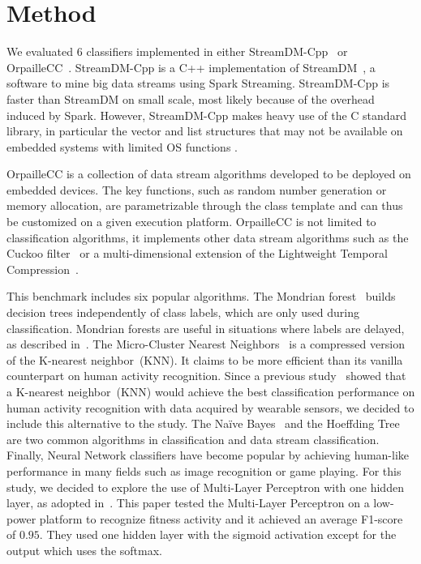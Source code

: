 \section{Method}
We evaluated 6 classifiers implemented in
either StreamDM-Cpp~\cite{StreamDM-CPP} or
OrpailleCC~\cite{OrpailleCC}.  StreamDM-Cpp is a
C++ implementation of StreamDM~\cite{StreamDM}, a
software to mine big data streams using Spark
Streaming. StreamDM-Cpp is faster than
StreamDM on small scale, most likely because of
the overhead induced by Spark. However, StreamDM-Cpp makes heavy
use of the C standard library, in particular the vector and
list structures that may not be available on embedded systems
with limited OS functions .

OrpailleCC is a
collection of data stream algorithms developed to
be deployed on embedded devices. The key
functions, such as random number generation or memory allocation, are
parametrizable through the class template and can thus be customized 
on a given execution platform.
OrpailleCC is not limited to classification
algorithms, it implements other data stream
algorithms such as the Cuckoo filter~\cite{cuckoo}
or a multi-dimensional extension of the
Lightweight Temporal Compression~\cite{multi-ltc}.

This benchmark includes six popular algorithms.  The Mondrian
forest~\cite{mondrian2014} builds decision trees independently of class labels,
which are only used during classification. Mondrian forests are useful in
situations where labels are delayed, as described
in~\cite{stream_learning_review}.  The Micro-Cluster Nearest
Neighbors~\cite{mc-nn} is a compressed version of the K-nearest neighbor~(KNN).
It claims to be more efficient than its vanilla counterpart on human activity
recognition. Since a previous study~\cite{Janidarmian_2017} showed that a
K-nearest neighbor~(KNN) would achieve the best classification performance on
human activity recognition with data acquired by wearable sensors, we decided
to include this alternative to the study.  The Naïve Bayes~\cite{naive_bayes}
and the Hoeffding Tree~\cite{VFDT} are two common algorithms in classification
and data stream classification.  Finally, Neural Network classifiers have
become popular by achieving human-like performance in many fields such as image
recognition or game playing. For this study, we decided to explore the use of
Multi-Layer Perceptron with one hidden layer, as adopted in~\cite{omid_2019}.
This paper tested the Multi-Layer Perceptron on a low-power platform to
recognize fitness activity and it achieved an
average F1-score of $0.95$. They used one hidden
layer with the sigmoid activation except for the
output which uses the softmax.

